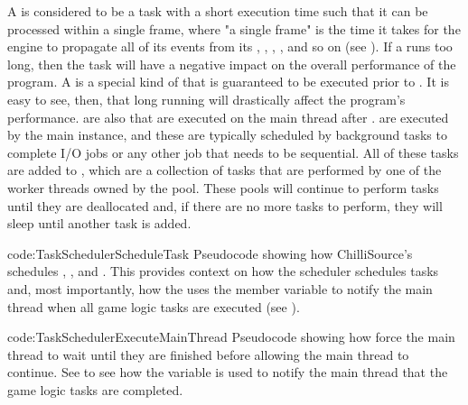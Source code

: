A  is considered to be a task with a short execution time such that it can be processed within a single frame, where "a single frame" is the time it takes for the engine to propagate all of its  events from its , , , , and so on (see ). If a  runs too long, then the task will have a negative impact on the overall performance of the program. A  is a special kind of  that is guaranteed to be executed prior to . It is easy to see, then, that long running  will drastically affect the program's performance.  are also  that are executed on the main thread after .  are executed by the main  instance, and these are typically scheduled by background tasks to complete I/O jobs or any other job that needs to be sequential. All of these tasks are added to , which are a collection of tasks that are performed by one of the worker threads owned by the pool. These pools will continue to perform tasks until they are deallocated and, if there are no more tasks to perform, they will sleep until another task is added.

\vspace{-0.5cm}
{code:TaskSchedulerScheduleTask}
{Pseudocode showing how ChilliSource's  schedules , , and . This provides context on how the scheduler schedules tasks and, most importantly, how the  uses the  member variable to notify the main thread when all game logic tasks are executed (see ). }

\vspace{-1.5cm}
{code:TaskSchedulerExecuteMainThread}
{Pseudocode showing how  force the main thread to wait until they are finished before allowing the main thread to continue. See  to see how the  variable is used to notify the main thread that the game logic tasks are completed.}
\vspace{-0.5cm}


